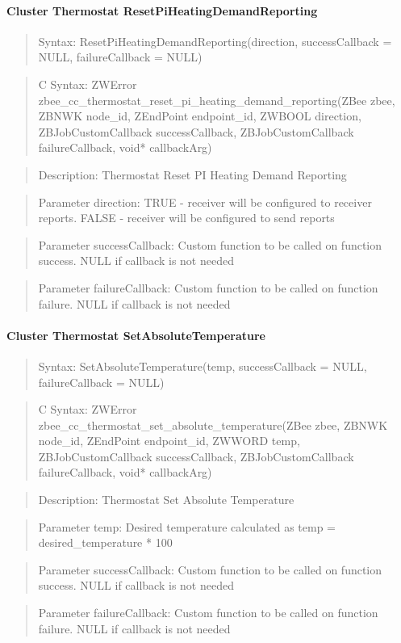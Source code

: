 \paragraph{Cluster Thermostat ResetPiHeatingDemandReporting}
\begin{quote}Syntax: ResetPiHeatingDemandReporting(direction, successCallback = NULL, failureCallback = NULL)\end{quote}
\begin{quote}C Syntax: ZWError zbee\_cc\_thermostat\_reset\_pi\_heating\_demand\_reporting(ZBee zbee, ZBNWK node\_id, ZEndPoint endpoint\_id, ZWBOOL direction, ZBJobCustomCallback successCallback, ZBJobCustomCallback failureCallback, void* callbackArg)\end{quote}
\begin{quote}Description: Thermostat Reset PI Heating Demand Reporting\end{quote}
\begin{quote}Parameter direction: TRUE  - receiver will be configured to receiver reports. FALSE - receiver will be configured to send reports\end{quote}
\begin{quote}Parameter successCallback: Custom function to be called on function success. NULL if callback is not needed\end{quote}
\begin{quote}Parameter failureCallback: Custom function to be called on function failure. NULL if callback is not needed\end{quote}


\paragraph{Cluster Thermostat SetAbsoluteTemperature}
\begin{quote}Syntax: SetAbsoluteTemperature(temp, successCallback = NULL, failureCallback = NULL)\end{quote}
\begin{quote}C Syntax: ZWError zbee\_cc\_thermostat\_set\_absolute\_temperature(ZBee zbee, ZBNWK node\_id, ZEndPoint endpoint\_id, ZWWORD temp, ZBJobCustomCallback successCallback, ZBJobCustomCallback failureCallback, void* callbackArg)\end{quote}
\begin{quote}Description: Thermostat Set Absolute Temperature\end{quote}
\begin{quote}Parameter temp: Desired temperature calculated as temp = desired\_temperature * 100\end{quote}
\begin{quote}Parameter successCallback: Custom function to be called on function success. NULL if callback is not needed\end{quote}
\begin{quote}Parameter failureCallback: Custom function to be called on function failure. NULL if callback is not needed\end{quote}



